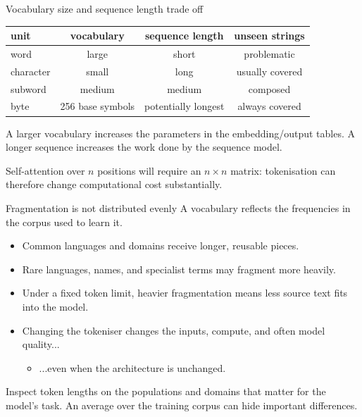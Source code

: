 \begin{frame}{Vocabulary size and sequence length trade off}
  \begin{center}
    \begin{tabular}{l|c|c|c}
      unit & vocabulary & sequence length & unseen strings \\ \hline
      word & large & short & problematic \\
      character & small & long & usually covered \\
      subword & medium & medium & composed \\
      byte & 256 base symbols & potentially longest & always covered
    \end{tabular}
  \end{center}

  A larger vocabulary increases the parameters in the embedding/output tables.
  A longer sequence increases the work done by the sequence model.
  \\[2ex]
  \begin{alertblock}{}
  Self-attention over $n$ positions will require an $n\times n$ matrix:
  tokenisation can therefore change computational cost substantially.
  \end{alertblock}
\end{frame}

\begin{frame}{Fragmentation is not distributed evenly}
  A vocabulary reflects the frequencies in the corpus used to learn it.

  \begin{itemize}
    \item Common languages and domains receive longer, reusable pieces.
    \item Rare languages, names, and specialist terms may fragment more heavily.
    \item Under a fixed token limit, heavier fragmentation means less source text
      fits into the model.
    \item Changing the tokeniser changes the inputs, compute, and often model
      quality...
      \begin{itemize}
        \item ...even when the architecture is unchanged.
      \end{itemize} 
  \end{itemize}

  \begin{block}{}
  Inspect token lengths on the populations and domains that matter for the model's task.
  An average over the training corpus can hide important differences.
  \end{block}
\end{frame}

